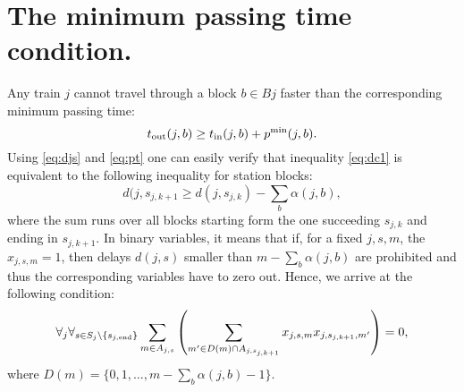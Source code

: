 \section{The minimum passing time condition.}
Any train $j$ cannot travel through a block $b \in Bj$ faster than the corresponding minimum
passing time:
\begin{equation}
  \label{eq:dc1}
  t_\text{out}(j, b) \ge t_\text{in}(j, b) + p^\text{min}(j, b).
\end{equation}
Using \eqref{eq:djs} and \eqref{eq:pt} one can easily verify that inequality
\eqref{eq:dc1} is equivalent to the following inequality for station blocks:
\begin{equation}
  \label{eq:passingtime}
  d(j, s_{j,k+1} \ge d(j, s_{j,k}) - \sum_{b}\alpha(j, b),
\end{equation}
where the sum runs over all blocks starting form the one succeeding $s_{j,k}$
and ending in $s_{j,k+1}$.
In binary variables, it means that if, for a fixed $j,s,m$, the $x_{j,s,m}=1$,
then delays $d(j,s)$ smaller than $m-\sum_{b}\alpha(j, b)$ are prohibited
and thus the corresponding variables have to zero out. Hence, we arrive at the
following condition:
\begin{equation}
  \label{eq:qubo:passingtime}
  \forall_{j} \forall_{s \in S_j \setminus \{s_{{j,\operatorname*{end}}}\}}
  \sum_{m \in A_{j,s}}
  \left(
  \sum_{ m' \in D(m) \cap A_{j, s_{j,k+1}}} x_{j, s, m}
  x_{j, s_{j,k+1}, m'} \right) = 0,
\end{equation}
where $D(m) = \{0, 1, \ldots, m - \sum_{b}\alpha(j, b) -1\}$.
